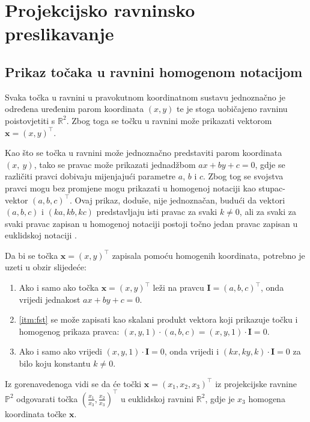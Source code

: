 \chapter{Projekcijsko ravninsko preslikavanje}

\section{Prikaz točaka u ravnini homogenom notacijom}

Svaka točka u ravnini u pravokutnom koordinatnom sustavu jednoznačno je određena uređenim parom koordinata $(x, y)$ te je stoga uobičajeno ravninu poistovjetiti s $\mathbb{R}^2$. Zbog toga se točku u ravnini može prikazati vektorom $\mathbf{x} = (x, y)^\top$.

Kao što se točka u ravnini može jednoznačno predstaviti  parom koordinata $(x,~y)$, tako se pravac može prikazati jednadžbom $ax + by + c = 0$, gdje se različiti pravci dobivaju mijenjajući parametre $a$, $b$ i $c$. Zbog tog se svojstva pravci mogu bez promjene mogu prikazati u homogenoj notaciji kao stupac-vektor $(a, b, c)^\top$. Ovaj prikaz, doduše, nije jednoznačan, budući da vektori $(a, b, c)$ i $(ka, kb, kc)$ predstavljaju isti pravac za svaki $k \neq 0$, ali za svaki za svaki pravac zapisan u homogenoj notaciji postoji točno jedan pravac zapisan u euklidskoj notaciji \citep{Hartley2004}.

Da bi se točka $\mathbf{x} = (x, y)^\top$ zapisala pomoću homogenih koordinata, potrebno je uzeti u obzir slijedeće:
\begin{enumerate}
	\item \label{itm:fst} Ako i samo ako točka $\mathbf{x} = (x, y)^\top$ leži na pravcu $\mathbf{I} =(a, b, c)^\top$, onda vrijedi jednakost $ax + by + c = 0$.
	\item \eqref{itm:fst}  se može zapisati kao skalani produkt vektora koji prikazuje točku i homogenog prikaza pravca: $(x, y, 1) \cdot (a, b, c) = (x, y, 1) \cdot \mathbf{I} = 0$.
	\item Ako i samo ako vrijedi $(x, y, 1) \cdot \mathbf{I} = 0$, onda vrijedi i  $(kx, ky, k) \cdot \mathbf{I} = 0$ za bilo koju konstantu $k \neq 0$.
\end{enumerate}

Iz gorenavedenoga vidi se da će točki $\mathbf{x} = (x_1, x_2, x_3)^\top$ iz projekcijske ravnine $\mathbb{P}^2$ odgovarati točka $(\frac{x_1}{x_3}, \frac{x_2}{x_3})^\top$ u euklidskoj ravnini $\mathbb{R}^2$, gdje je $x_3$ homogena koordinata točke $\mathbf{x}$.

